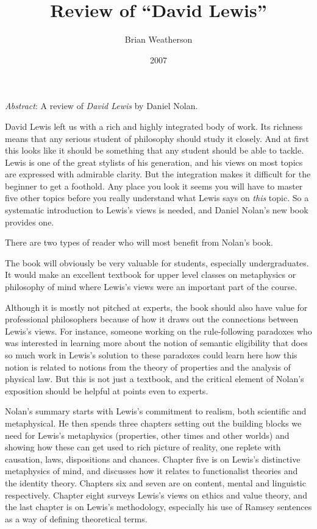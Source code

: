 \documentclass[
  11pt,
  letterpaper,
  DIV=11,
  numbers=noendperiod,
  twoside]{scrartcl}
\title{Review of ``David Lewis''}
\author{Brian Weatherson}
\date{2007}
\renewenvironment{abstract}
 {\vspace{-1.25cm}
 \quotation\small\noindent\emph{Abstract}:}
 {\endquotation}
\renewenvironment{abstract}
 {\quotation\small\noindent\emph{Abstract}:}
 {\endquotation\vspace{-0.02cm}}
\begin{document}
\maketitle
\begin{abstract}
A review of \emph{David Lewis} by Daniel Nolan.
\end{abstract}


David Lewis left us with a rich and highly integrated body of work. Its
richness means that any serious student of philosophy should study it
closely. And at first this looks like it should be something that any
student should be able to tackle. Lewis is one of the great stylists of
his generation, and his views on most topics are expressed with
admirable clarity. But the integration makes it difficult for the
beginner to get a foothold. Any place you look it seems you will have to
master five other topics before you really understand what Lewis says on
\emph{this} topic. So a systematic introduction to Lewis's views is
needed, and Daniel Nolan's new book provides one.

There are two types of reader who will most benefit from Nolan's book.

The book will obviously be very valuable for students, especially
undergraduates. It would make an excellent textbook for upper level
classes on metaphysics or philosophy of mind where Lewis's views were an
important part of the course.

Although it is mostly not pitched at experts, the book should also have
value for professional philosophers because of how it draws out the
connections between Lewis's views. For instance, someone working on the
rule-following paradoxes who was interested in learning more about the
notion of semantic eligibility that does so much work in Lewis's
solution to these paradoxes could learn here how this notion is related
to notions from the theory of properties and the analysis of physical
law. But this is not just a textbook, and the critical element of
Nolan's exposition should be helpful at points even to experts.

Nolan's summary starts with Lewis's commitment to realism, both
scientific and metaphysical. He then spends three chapters setting out
the building blocks we need for Lewis's metaphysics (properties, other
times and other worlds) and showing how these can get used to rich
picture of reality, one replete with causation, laws, dispositions and
chances. Chapter five is on Lewis's distinctive metaphysics of mind, and
discusses how it relates to functionalist theories and the identity
theory. Chapters six and seven are on content, mental and linguistic
respectively. Chapter eight surveys Lewis's views on ethics and value
theory, and the last chapter is on Lewis's methodology, especially his
use of Ramsey sentences as a way of defining theoretical terms.
\end{document}
